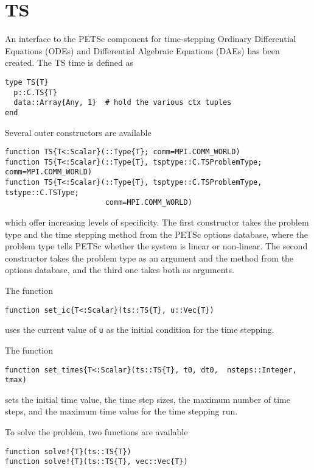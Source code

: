 \documentclass{article}
\begin{document}
\section{TS}
An interface to the PETSc component for time-stepping Ordinary Differential
Equations (ODEs) and Differential Algebraic Equations (DAEs) has been created.
The TS time is defined as

\begin{verbatim}
type TS{T}
  p::C.TS{T}
  data::Array{Any, 1}  # hold the various ctx tuples
end
\end{verbatim}

Several outer constructors are available

\begin{verbatim}
function TS{T<:Scalar}(::Type{T}; comm=MPI.COMM_WORLD)
function TS{T<:Scalar}(::Type{T}, tsptype::C.TSProblemType; comm=MPI.COMM_WORLD)
function TS{T<:Scalar}(::Type{T}, tsptype::C.TSProblemType, tstype::C.TSType; 
                       comm=MPI.COMM_WORLD)
\end{verbatim}

\noindent which offer increasing levels of specificity.  The first constructor
takes the problem type and the time stepping method from the PETSc options 
database, where the problem type tells PETSc whether the system is linear or
non-linear. The second constructor takes the problem type as an argument and
the method from the options database, and the third one takes both as arguments.

The function
\begin{verbatim}
function set_ic{T<:Scalar}(ts::TS{T}, u::Vec{T}) 
\end{verbatim}

\noindent uses the current value of \texttt{u} as the initial condition for 
the time stepping.

The function
\begin{verbatim}
function set_times{T<:Scalar}(ts::TS{T}, t0, dt0,  nsteps::Integer, tmax)
\end{verbatim}

\noindent sets the initial time value, the time step sizes, the maximum number
of time steps, and the maximum time value for the time stepping run.

To solve the problem, two functions are available
\begin{verbatim}
function solve!{T}(ts::TS{T})
function solve!{T}(ts::TS{T}, vec::Vec{T})
\end{verbatim}
\end{document}
